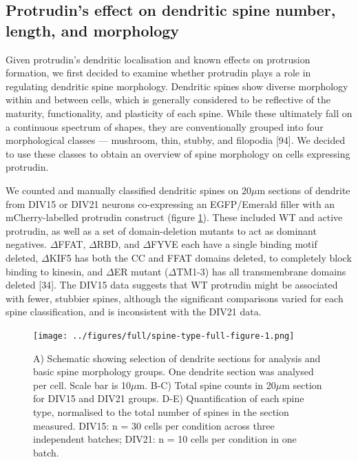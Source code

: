 \documentclass[
  12pt,
  a4paper,
]{book}
\begin{document}
\hypertarget{protrudins-effect-on-dendritic-spine-number-length-and-morphology}{%
\subsection{Protrudin's effect on dendritic spine number, length, and morphology}\label{protrudins-effect-on-dendritic-spine-number-length-and-morphology}}

Given protrudin's dendritic localisation and known effects on protrusion formation, we first decided to examine whether protrudin plays a role in regulating dendritic spine morphology. Dendritic spines show diverse morphology within and between cells, which is generally considered to be reflective of the maturity, functionality, and plasticity of each spine. While these ultimately fall on a continuous spectrum of shapes, they are conventionally grouped into four morphological classes --- mushroom, thin, stubby, and filopodia {[}94{]}. We decided to use these classes to obtain an overview of spine morphology on cells expressing protrudin.

We counted and manually classified dendritic spines on 20\(\mu\)m sections of dendrite from DIV15 or DIV21 neurons co-expressing an EGFP/Emerald filler with an mCherry-labelled protrudin construct (figure \ref{fig:spine-type-full-figure}). These included WT and active protrudin, as well as a set of domain-deletion mutants to act as dominant negatives. \(\Delta\)FFAT, \(\Delta\)RBD, and \(\Delta\)FYVE each have a single binding motif deleted, \(\Delta\)KIF5 has both the CC and FFAT domains deleted, to completely block binding to kinesin, and \(\Delta\)ER mutant (\(\Delta\)TM1-3) has all transmembrane domains deleted {[}34{]}. The DIV15 data suggests that WT protrudin might be associated with fewer, stubbier spines, although the significant comparisons varied for each spine classification, and is inconsistent with the DIV21 data.


\begin{figure}
\centering
\texttt{[image: ../figures/full/spine-type-full-figure-1.png]}
\caption{\label{fig:spine-type-full-figure}A) Schematic showing selection of dendrite sections for analysis and basic spine morphology groups. One dendrite section was analysed per cell. Scale bar is 10\(\mu\)m. B-C) Total spine counts in 20\(\mu\)m section for DIV15 and DIV21 groups. D-E) Quantification of each spine type, normalised to the total number of spines in the section measured. DIV15: n = 30 cells per condition across three independent batches; DIV21: n = 10 cells per condition in one batch.}
\end{figure}
\end{document}
